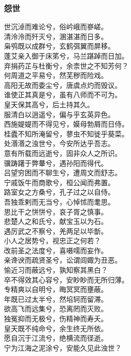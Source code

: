 \documentclass[]{article}
\begin{document}
\hypertarget{header-n235}{%
\subsubsection{怨世}\label{header-n235}}

世沉淖而难论兮，俗岒峨而嵾嵯。\\
清泠泠而歼灭兮，溷湛湛而日多。\\
枭鸮既以成群兮，玄鹤弭翼而屏移。\\
蓬艾亲入御于床笫兮，马兰踸踔而日加。\\
弃捐药芷与杜衡兮，余柰世之不知芳何？\\
何周道之平易兮，然芜秽而险戏。\\
高阳无故而委尘兮，唐虞点灼而毁议。\\
谁使正其真是兮，虽有八师而不可为。\\
皇天保其高兮，后土持其久。\\
服清白以逍遥兮，偏与乎玄英异色。\\
西施媞媞而不得见兮，嫫母勃屑而日侍。\\
桂蠹不知所淹留兮，蓼虫不知徙乎葵菜。\\
处湣湣之浊世兮，今安所达乎吾志。\\
意有所载而远逝兮，固非众人之所识。\\
骥踌躇于弊輂兮，遇孙阳而得代。\\
吕望穷困而不聊生兮，遭周文而舒志。\\
宁戚饭牛而商歌兮，桓公闻而弗置。\\
路室女之方桑兮，孔子过之以自侍。\\
吾独乖剌而无当兮，心悼怵而耄思。\\
思比干之恲恲兮，哀子胥之慎事。\\
悲楚人之和氏兮，献宝玉以为石。\\
遇厉武之不察兮，羌两足以毕斮。\\
小人之居势兮，视忠正之何若？\\
改前圣之法度兮，喜嗫嚅而妄作。\\
亲谗谀而疏贤圣兮，讼谓闾娵为丑恶。\\
愉近习而蔽远兮，孰知察其黑白？\\
卒不得效其心容兮，安眇眇而无所归薄。\\
专精爽以自明兮，晦冥冥而壅蔽。\\
年既已过太半兮，然埳轲而留滞。\\
欲高飞而远集兮，恐离罔而灭败。\\
独冤抑而无极兮，伤精神而寿夭。\\
皇天既不纯命兮，余生终无所依。\\
愿自沉于江流兮，绝横流而径逝。\\
宁为江海之泥涂兮，安能久见此浊世？
\end{document}
